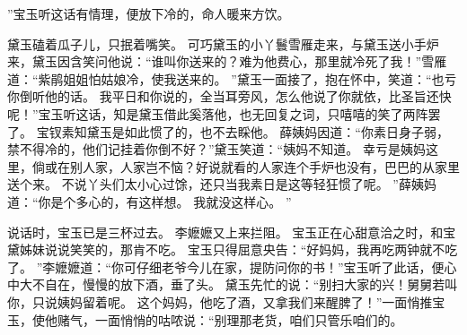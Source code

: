 ”宝玉听这话有情理，便放下冷的，命人暖来方饮。
\par
黛玉磕着瓜子儿，只抿着嘴笑。
可巧黛玉的小丫鬟雪雁走来，与黛玉送小手炉来，黛玉因含笑问他说：“谁叫你送来的？难为他费心，那里就冷死了我！”雪雁道：“紫鹃姐姐怕姑娘冷，使我送来的。
”黛玉一面接了，抱在怀中，笑道：“也亏你倒听他的话。
我平日和你说的，全当耳旁风，怎么他说了你就依，比圣旨还快呢！”宝玉听这话，知是黛玉借此奚落他，也无回复之词，只嘻嘻的笑了两阵罢了。
宝钗素知黛玉是如此惯了的，也不去睬他。
薛姨妈因道：“你素日身子弱，禁不得冷的，他们记挂着你倒不好？”黛玉笑道：“姨妈不知道。
幸亏是姨妈这里，倘或在别人家，人家岂不恼？好说就看的人家连个手炉也没有，巴巴的从家里送个来。
不说丫头们太小心过馀，还只当我素日是这等轻狂惯了呢。
”薛姨妈道：“你是个多心的，有这样想。
我就没这样心。
”\par
说话时，宝玉已是三杯过去。
李嬷嬷又上来拦阻。
宝玉正在心甜意洽之时，和宝黛姊妹说说笑笑的，那肯不吃。
宝玉只得屈意央告：“好妈妈，我再吃两钟就不吃了。
”李嬷嬷道：“你可仔细老爷今儿在家，提防问你的书！”宝玉听了此话，便心中大不自在，慢慢的放下酒，垂了头。
黛玉先忙的说：“别扫大家的兴！舅舅若叫你，只说姨妈留着呢。
这个妈妈，他吃了酒，又拿我们来醒脾了！”一面悄推宝玉，使他赌气，一面悄悄的咕哝说：“别理那老货，咱们只管乐咱们的。
